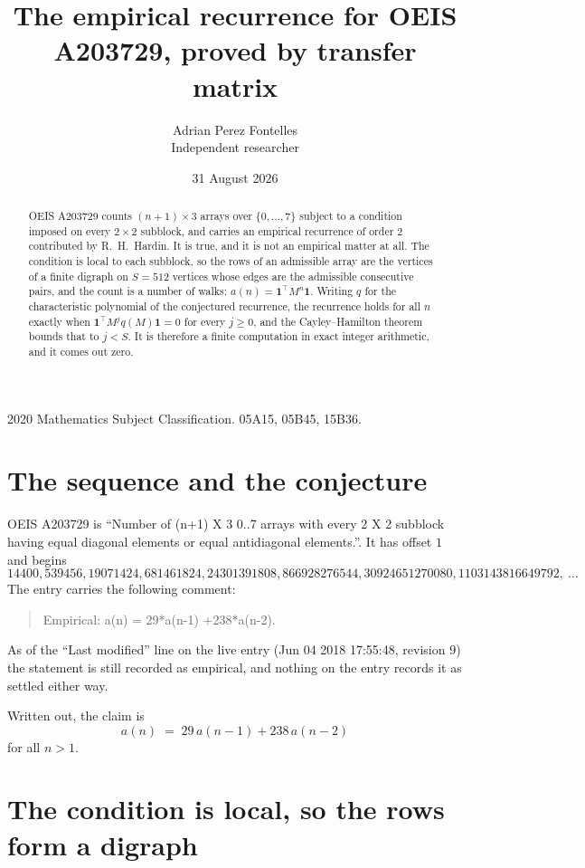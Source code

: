 \documentclass[11pt,a4paper]{article}
\title{The empirical recurrence for OEIS A203729, proved by transfer matrix}
\author{Adrian Perez Fontelles\\ \small Independent researcher}
\date{31 August 2026}
\theoremstyle{plain}
\theoremstyle{definition}
\begin{document}
\maketitle

\begin{abstract}
OEIS A203729 counts $(n+1)\times3$ arrays over $\{0,\dots,7\}$ subject to a condition imposed on
every $2\times2$ subblock, and carries an empirical recurrence of order $2$ contributed
by R.~H.~Hardin. It is true, and it is not an empirical matter at all. The condition is local
to each subblock, so the rows of an admissible array are the vertices of a finite digraph
on $S=512$ vertices whose edges are the admissible consecutive pairs, and the count is a
number of walks: $a(n)=\mathbf{1}^{\!\top}M^{n}\mathbf{1}$. Writing $q$
for the characteristic polynomial of the conjectured recurrence, the recurrence holds for all
$n$ exactly when $\mathbf{1}^{\!\top}M^{j}q(M)\mathbf{1}=0$ for every $j\ge0$, and the
Cayley--Hamilton theorem bounds that to $j<S$. It is therefore a finite computation in exact
integer arithmetic, and it comes out zero.
\end{abstract}

\noindent\small 2020 Mathematics Subject Classification. 05A15, 05B45, 15B36.\normalsize

\section{The sequence and the conjecture}

OEIS A203729 is ``Number of (n+1) X 3 0..7 arrays with every 2 X 2 subblock having equal diagonal elements or equal antidiagonal elements.''. It has offset $1$ and begins
\[
14400, 539456, 19071424, 681461824, 24301391808, 866928276544, 30924651270080, 1103143816649792,\ \dots
\]
The entry carries the following comment:
\begin{quote}\small
Empirical: a(n) = 29*a(n-1) +238*a(n-2).
\end{quote}
As of the ``Last modified'' line on the live entry (Jun 04 2018 17:55:48, revision 9) the statement is
still recorded as empirical, and nothing on the entry records it as settled either way.

Written out, the claim is
\begin{equation}\label{eq:conj}
a(n)\;=\;29\,a(n-1) + 238\,a(n-2)
\end{equation}
for all $n>1$.

\section{The condition is local, so the rows form a digraph}
\end{document}
